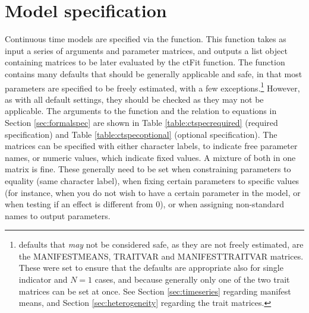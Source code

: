 \documentclass[nojss]{jss}\usepackage[]{graphicx}\usepackage[]{color}
\begin{document}
\section{Model specification} \label{sec:modelspec}\nopagebreak
Continuous time models are specified via the  function. This function takes as input a series of arguments and parameter matrices, and outputs a list object containing matrices to be later evaluated by the ctFit function. The  function contains many defaults that should be generally applicable and safe, in that most parameters are specified to be freely estimated, with a few exceptions.\footnote{ defaults that \textit{may} not be considered safe, as they are not freely estimated, are the MANIFESTMEANS, TRAITVAR and MANIFESTTRAITVAR matrices. These were set to ensure that the defaults are appropriate also for single indicator and $N = 1$ cases, and because generally only one of the two trait matrices can be set at once. See Section \ref{sec:timeseries} regarding manifest means, and Section \ref{sec:heterogeneity} regarding the trait matrices.} However, as with all default settings, they should be checked as they may not be applicable. 
The arguments to the  function and the relation to equations in Section \ref{sec:formalspec} are shown in Table \ref{table:ctspecrequired} (required specification) and Table \ref{table:ctspecoptional} (optional specification). The matrices can be specified with either character labels, to indicate free parameter names, or numeric values, which indicate fixed values. A mixture of both in one matrix is fine. These generally need to be set when constraining parameters to equality (same character label), when fixing certain parameters to specific values (for instance, when you do not wish to have a certain parameter in the model, or when testing if an effect is different from 0), or when assigning non-standard names to output parameters. 
\end{document}
